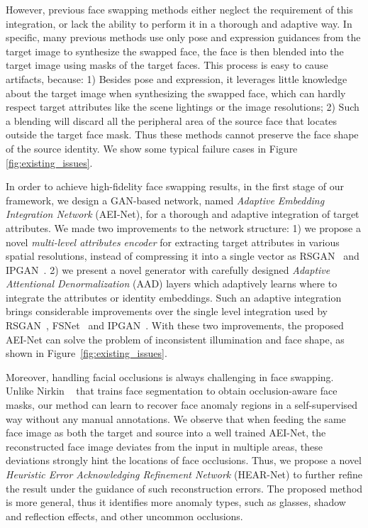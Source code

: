 However, previous face swapping methods either neglect the requirement of this integration, or lack the ability to perform it in a thorough and adaptive way.
In specific, many previous methods use only pose and expression guidances from the target image to synthesize the swapped face, the face is then blended into the target image using masks of the target faces. This process is easy to cause artifacts, because:
1) Besides pose and expression, it leverages little knowledge about the target image when synthesizing the swapped face, which can hardly respect target attributes like the scene lightings or the image resolutions; 
2) Such a blending will discard all the peripheral area of the source face that locates outside the target face mask. Thus these methods cannot preserve the face shape of the source identity.
We show some typical failure cases in Figure \ref{fig:existing_issues}. 

In order to achieve high-fidelity face swapping results, in the first stage of our framework, we design a GAN-based network, named \emph{Adaptive Embedding Integration Network} (AEI-Net), for a thorough and adaptive integration of target attributes. We made two improvements to the network structure: 1) we propose a novel \emph{multi-level attributes encoder} for extracting target attributes in various spatial resolutions, instead of compressing it into a single vector as RSGAN~\cite{natsume2018rsgan} and IPGAN~\cite{Bao_ipgan}. 2) we present a novel generator with carefully designed \emph{Adaptive Attentional Denormalization} ({AAD}) layers which adaptively learns where to integrate the attributes or identity embeddings. Such an adaptive integration brings considerable improvements over the single level integration used by RSGAN~\cite{natsume2018rsgan}, FSNet~\cite{natsume2018fsnet} and IPGAN~\cite{Bao_ipgan}. With these two improvements, the proposed AEI-Net can solve the problem of inconsistent illumination and face shape, as shown in Figure~\ref{fig:existing_issues}.

Moreover, handling facial occlusions is always challenging in face swapping. Unlike Nirkin \etal~\cite{nirkin2019fsgan,nirkin2018face} that trains face segmentation to obtain occlusion-aware face masks, our method can learn to recover face anomaly regions in a self-supervised way without any manual annotations. 
We observe that when feeding the same face image as both the target and source into a well trained AEI-Net, the reconstructed face image deviates from the input in multiple areas, these deviations strongly hint the locations of face occlusions. Thus,
we propose a novel \emph{Heuristic Error Acknowledging Refinement Network} ({HEAR-Net}) to further refine the result under the guidance of such reconstruction errors. The proposed method is more general, thus it identifies more anomaly types, such as glasses, shadow and reflection effects, and other uncommon occlusions.

